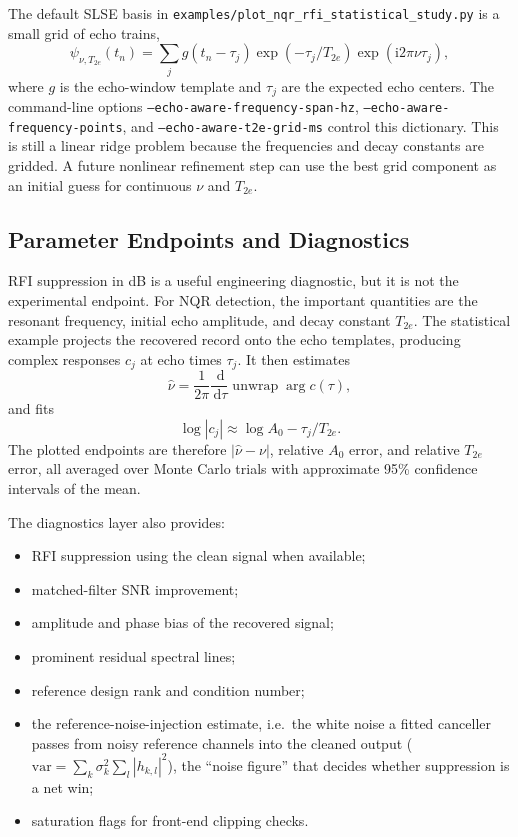 \documentclass[11pt,oneside]{report}
\newcommand{\code}[1]{\texttt{#1}}
\newcommand{\dd}{\,\mathrm{d}}
\newcommand{\ii}{\mathrm{i}}
\begin{document}
The default SLSE basis in
\code{examples/plot\_nqr\_rfi\_statistical\_study.py} is a small grid of echo
trains,
\[
  \psi_{\nu,T_{2e}}(t_n)
  =
  \sum_j
  g(t_n-\tau_j)
  \exp(-\tau_j/T_{2e})
  \exp(\ii 2\pi\nu\tau_j),
\]
where \(g\) is the echo-window template and \(\tau_j\) are the expected echo
centers. The command-line options
\code{--echo-aware-frequency-span-hz},
\code{--echo-aware-frequency-points}, and
\code{--echo-aware-t2e-grid-ms} control this dictionary. This is still a linear
ridge problem because the frequencies and decay constants are gridded. A future
nonlinear refinement step can use the best grid component as an initial guess
for continuous \(\nu\) and \(T_{2e}\).

\subsection{Parameter Endpoints and Diagnostics}

RFI suppression in dB is a useful engineering diagnostic, but it is not the
experimental endpoint. For NQR detection, the important quantities are the
resonant frequency, initial echo amplitude, and decay constant \(T_{2e}\). The
statistical example projects the recovered record onto the echo templates,
producing complex responses \(c_j\) at echo times \(\tau_j\). It then estimates
\[
  \widehat{\nu}
  =
  \frac{1}{2\pi}\frac{\dd}{\dd\tau}
  \operatorname{unwrap}\arg c(\tau),
\]
and fits
\[
  \log |c_j|
  \approx
  \log A_0 - \tau_j/T_{2e}.
\]
The plotted endpoints are therefore
\(|\widehat{\nu}-\nu|\), relative \(A_0\) error, and relative \(T_{2e}\) error,
all averaged over Monte Carlo trials with approximate 95\% confidence
intervals of the mean.

The diagnostics layer also provides:
\begin{itemize}
  \item RFI suppression using the clean signal when available;
  \item matched-filter SNR improvement;
  \item amplitude and phase bias of the recovered signal;
  \item prominent residual spectral lines;
  \item reference design rank and condition number;
  \item the reference-noise-injection estimate, i.e.\ the white noise a fitted
  canceller passes from noisy reference channels into the cleaned output
  (\(\mathrm{var}=\sum_k \sigma_k^2 \sum_l |h_{k,l}|^2\)), the ``noise figure''
  that decides whether suppression is a net win;
  \item saturation flags for front-end clipping checks.
\end{itemize}
\end{document}
